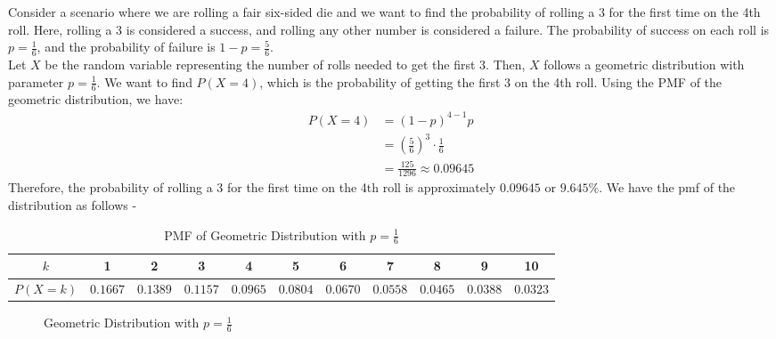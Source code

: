 \documentclass[openany]{book}
\begin{document}
\begin{example}
    Consider a scenario where we are rolling a fair six-sided die and we want to find the probability of rolling a 3 for the first time on the 4th roll. Here, rolling a 3 is considered a success, and rolling any other number is considered a failure. The probability of success on each roll is $p = \frac{1}{6}$, and the probability of failure is $1 - p = \frac{5}{6}$. \\
    Let $X$ be the random variable representing the number of rolls needed to get the first 3. Then, $X$ follows a geometric distribution with parameter $p = \frac{1}{6}$. We want to find $P(X = 4)$, which is the probability of getting the first 3 on the 4th roll. Using the PMF of the geometric distribution, we have:
    \begin{align*}
        P(X = 4) &= (1 - p)^{4 - 1} p \\
        &= \left(\frac{5}{6}\right)^{3} \cdot \frac{1}{6} \\
        &= \frac{125}{1296} \approx 0.09645
    \end{align*}
    Therefore, the probability of rolling a 3 for the first time on the 4th roll is approximately $0.09645$ or $9.645\%$.
    We have the pmf of the distribution as follows -
    \begin{table}[H]
        \centering
        \begin{tabular}{c|cccccccccc}
            $k$ & 1 & 2 & 3 & 4 & 5 & 6 & 7 & 8 & 9 & 10 \\
            \hline
            $P(X = k)$ & $0.1667$ & $0.1389$ & $0.1157$ & $0.0965$ & $0.0804$ & $0.0670$ & $0.0558$ & $0.0465$ & $0.0388$ & $0.0323$ \\
        \end{tabular}
        \caption{PMF of Geometric Distribution with $p = \frac{1}{6}$}
    \end{table}
    \begin{figure}[H]
        \centering
        \caption{Geometric Distribution with $p = \frac{1}{6}$}
    \end{figure}
\end{example}
\end{document}
